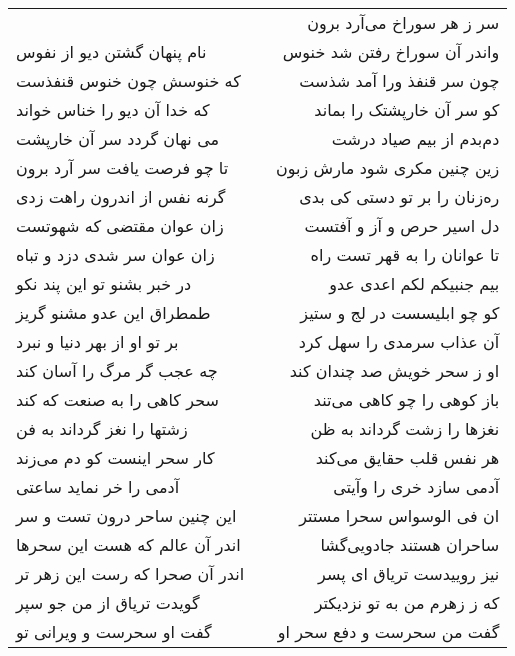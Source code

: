 \begin{center}
\begin{longtable}{l p{0.5cm} r}
&&
سر ز هر سوراخ می‌آرد برون
\\
نام پنهان گشتن دیو از نفوس
&&
واندر آن سوراخ رفتن شد خنوس
\\
که خنوسش چون خنوس قنفذست
&&
چون سر قنفذ ورا آمد شذست
\\
که خدا آن دیو را خناس خواند
&&
کو سر آن خارپشتک را بماند
\\
می نهان گردد سر آن خارپشت
&&
دم‌بدم از بیم صیاد درشت
\\
تا چو فرصت یافت سر آرد برون
&&
زین چنین مکری شود مارش زبون
\\
گرنه نفس از اندرون راهت زدی
&&
ره‌زنان را بر تو دستی کی بدی
\\
زان عوان مقتضی که شهوتست
&&
دل اسیر حرص و آز و آفتست
\\
زان عوان سر شدی دزد و تباه
&&
تا عوانان را به قهر تست راه
\\
در خبر بشنو تو این پند نکو
&&
بیم جنبیکم لکم اعدی عدو
\\
طمطراق این عدو مشنو گریز
&&
کو چو ابلیسست در لج و ستیز
\\
بر تو او از بهر دنیا و نبرد
&&
آن عذاب سرمدی را سهل کرد
\\
چه عجب گر مرگ را آسان کند
&&
او ز سحر خویش صد چندان کند
\\
سحر کاهی را به صنعت که کند
&&
باز کوهی را چو کاهی می‌تند
\\
زشتها را نغز گرداند به فن
&&
نغزها را زشت گرداند به ظن
\\
کار سحر اینست کو دم می‌زند
&&
هر نفس قلب حقایق می‌کند
\\
آدمی را خر نماید ساعتی
&&
آدمی سازد خری را وآیتی
\\
این چنین ساحر درون تست و سر
&&
ان فی الوسواس سحرا مستتر
\\
اندر آن عالم که هست این سحرها
&&
ساحران هستند جادویی‌گشا
\\
اندر آن صحرا که رست این زهر تر
&&
نیز روییدست تریاق ای پسر
\\
گویدت تریاق از من جو سپر
&&
که ز زهرم من به تو نزدیکتر
\\
گفت او سحرست و ویرانی تو
&&
گفت من سحرست و دفع سحر او
\\
\end{longtable}
\end{center}
